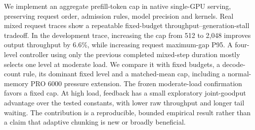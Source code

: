 We implement an aggregate prefill-token cap in native single-GPU serving, preserving request order, admission rules, model precision and kernels. Real mixed request traces show a repeatable fixed-budget throughput--generation-stall tradeoff. In the development trace, increasing the cap from 512 to 2,048 improves output throughput by 6.6\%, while increasing request maximum-gap P95. A four-level controller using only the previous completed mixed-step duration mostly selects one level at moderate load. We compare it with fixed budgets, a decode-count rule, its dominant fixed level and a matched-mean cap, including a normal-memory PRO 6000 pressure extension. The frozen moderate-load confirmation favors a fixed cap. At high load, feedback has a small exploratory joint-goodput advantage over the tested constants, with lower raw throughput and longer tail waiting. The contribution is a reproducible, bounded empirical result rather than a claim that adaptive chunking is new or broadly beneficial.

